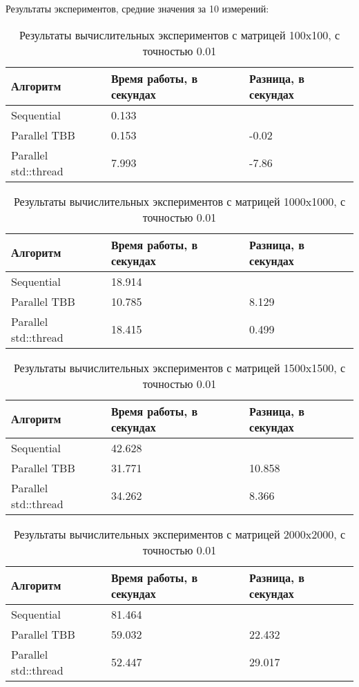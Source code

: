 \documentclass{report}
\begin{document}
\par Результаты экспериментов, средние значения за 10 измерений:

\begin{table}[!ht]
\centering
\begin{tabular}{| p{5cm} | p{5cm} | p{5cm} |}
\hline
Алгоритм & Время работы, в секундах & Разница, в секундах  \\[5pt]
\hline
Sequential              & 0.133       &  \\
Parallel TBB            & 0.153       & -0.02 \\
Parallel std::thread    & 7.993       & -7.86 \\
\hline
\end{tabular}
\caption{Результаты вычислительных экспериментов с матрицей 100x100, с точностью 0.01}
\end{table}

\begin{table}[!ht]
\centering
\begin{tabular}{| p{5cm} | p{5cm} | p{5cm} |}
\hline
Алгоритм & Время работы, в секундах & Разница, в секундах  \\[5pt]
\hline
Sequential              & 18.914       &  \\
Parallel TBB            & 10.785       & 8.129 \\
Parallel std::thread    & 18.415       & 0.499 \\
\hline
\end{tabular}
\caption{Результаты вычислительных экспериментов с матрицей 1000x1000, с точностью 0.01}
\end{table}

\begin{table}[!ht]
\centering
\begin{tabular}{| p{5cm} | p{5cm} | p{5cm} |}
\hline
Алгоритм & Время работы, в секундах & Разница, в секундах \\[5pt]
\hline
Sequential              & 42.628       &  \\
Parallel TBB            & 31.771       & 10.858 \\
Parallel std::thread    & 34.262       & 8.366 \\
\hline
\end{tabular}
\caption{Результаты вычислительных экспериментов с матрицей 1500x1500, с точностью 0.01}
\end{table}

\begin{table}[!ht]
\centering
\begin{tabular}{| p{5cm} | p{5cm} | p{5cm} |}
\hline
Алгоритм & Время работы, в секундах & Разница, в секундах  \\[5pt]
\hline
Sequential              & 81.464       &  \\
Parallel TBB            & 59.032       & 22.432 \\
Parallel std::thread    & 52.447       & 29.017 \\
\hline
\end{tabular}
\caption{Результаты вычислительных экспериментов с матрицей 2000x2000, с точностью 0.01}
\end{table}
\end{document}
